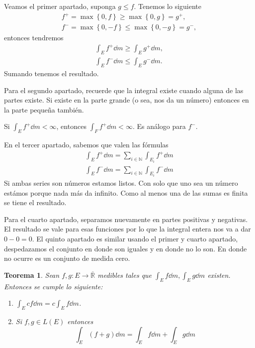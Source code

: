 \documentclass[12pt]{article}
\theoremstyle{plain}
\newtheorem{Th}{Teorema}[subsection]   %
\theoremstyle{definition}
\theoremstyle{remark}
\numberwithin{equation}{section}
\newcommand{\bN}{\mathbb{N}}        %
\newcommand{\bR}{\mathbb{R}}        %
\renewcommand{\geq}{\geqslant}      %
\renewcommand{\leq}{\leqslant}      %
\renewcommand{\:}{\colon}           %
\newcommand{\conj}[1]{\left\lbrace#1\right\rbrace}
\begin{document}
\begin{multicols}{2}
\begin{ptcbp}
Veamos el primer apartado, suponga $g\leq f$. Tenemos lo siguiente
\begin{gather*}
   f^+=\max\conj{0,f}\geq \max\conj{0,g}=g^+,\\
  f^-=\max\conj{0,-f}\leq\max\conj{0,-g}=g^-,
\end{gather*}
entonces tendremos
\begin{gather*}
  \int_Ef^+\dd m\geq\int_Eg^+\dd m,\\
   \int_Ef^-\dd m\leq\int_Eg^-\dd m.
\end{gather*}
Sumando tenemos el resultado. \par
Para el segundo apartado, recuerde que la integral existe cuando alguna de las partes existe. Si existe en la parte grande (o sea, nos da un número) entonces en la parte pequeña también.\par
Si $\int_Ef^+\dd m<\infty$, entonces $\int_Ff^+\dd m<\infty$. Es análogo para $f^-$.\par
En el tercer apartado, sabemos que valen las fórmulas
\begin{gather*}
\int_Ef^+\dd m=\sum_{i\in\bN}\int_{E_i}f^+\dd m\\
\int_Ef^-\dd m=\sum_{i\in\bN}\int_{E_i}f^-\dd m
\end{gather*}
Si ambas series son números estamos listos. Con solo que uno sea un número estámos porque nada más da infinito. Como al menos una de las sumas es finita se tiene el resultado.\par
Para el cuarto apartado, separamos nuevamente en partes positivas y negativas. El resultado se vale para esas funciones por lo que la integral entera nos va a dar $0-0=0$. El quinto apartado es similar usando el primer y cuarto apartado, despedazamos el conjunto en donde son iguales y en donde no lo son. En donde no ocurre es un conjunto de medida cero.
\end{ptcbp}

\begin{Th}
  Sean $f,g\:E\to\overline{\bR}$ medibles tales que $\int_Ef\dd m,\int_Eg\dd m$ existen. Entonces se cumple lo siguiente:
  \begin{enumerate}
    \item $\int_Ecf\dd m=c\int_E f \dd m$.
    \item Si $f,g\in L(E)$ entonces
    $$\int_E(f+g)\dd m=\int_Ef\dd m+\int_Eg\dd m$$
  \end{enumerate}
\end{Th}


\end{multicols}
\end{document}
